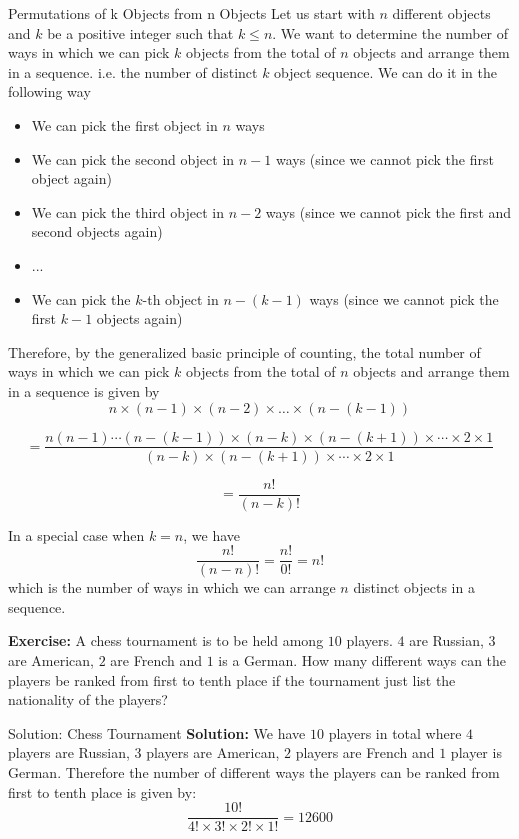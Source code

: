 \begin{keyconceptboxbreak}{Permutations of k Objects from n Objects}
Let us start with \(n\) different objects and \(k\) be a positive integer such that \(k \leq n\). We want to determine the number of ways in which we can pick \(k\) objects from the total of \(n\) objects and arrange them in a sequence. i.e. the number of distinct \(k\) object sequence. We can do it in the following way 

\begin{itemize}
    \item We can pick the first object in \(n\) ways
    \item We can pick the second object in \(n-1\) ways (since we cannot pick the first object again)
    \item We can pick the third object in \(n-2\) ways (since we cannot pick the first and second objects again)
    \item ...
    \item We can pick the \(k\)-th object in \(n-(k-1)\) ways (since we cannot pick the first \(k-1\) objects again)
\end{itemize}

Therefore, by the generalized basic principle of counting, the total number of ways in which we can pick \(k\) objects from the total of \(n\) objects and arrange them in a sequence is given by
\[ 
    n \times (n-1) \times (n-2) \times \ldots \times (n-(k-1)) 
\]

\[
    = \frac{n(n-1)\cdots(n-(k-1))\times (n-k) \times (n-(k+1)) \times \cdots \times 2 \times 1}{(n-k) \times (n-(k+1)) \times \cdots \times 2 \times 1} 
\]

\[
= \frac{n!}{(n-k)!}
\]

In a special case when \(k=n\), we have
\[ \frac{n!}{(n-n)!} = \frac{n!}{0!} = n! \]
which is the number of ways in which we can arrange \(n\) distinct objects in a sequence.
\end{keyconceptboxbreak}
\begin{exerciseboxbreak}{}
    \textbf{Exercise:} A chess tournament is to be held among \(10\) players. \(4\) are Russian, \(3\) are American, \(2\) are French and \(1\) is a German. How many different ways can the players be ranked from first to tenth place if the tournament just list the nationality of the players?
\end{exerciseboxbreak}


\begin{solutionboxbreak}{Solution: Chess Tournament}
    \textbf{Solution:} We have \(10\) players in total where \(4\) players are Russian, \(3\) players are American, \(2\) players are French and \(1\) player is German. Therefore the number of different ways the players can be ranked from first to tenth place is given by:
    \[ \frac{10!}{4! \times 3! \times 2! \times 1!} = 12600 \]
\end{solutionboxbreak}

